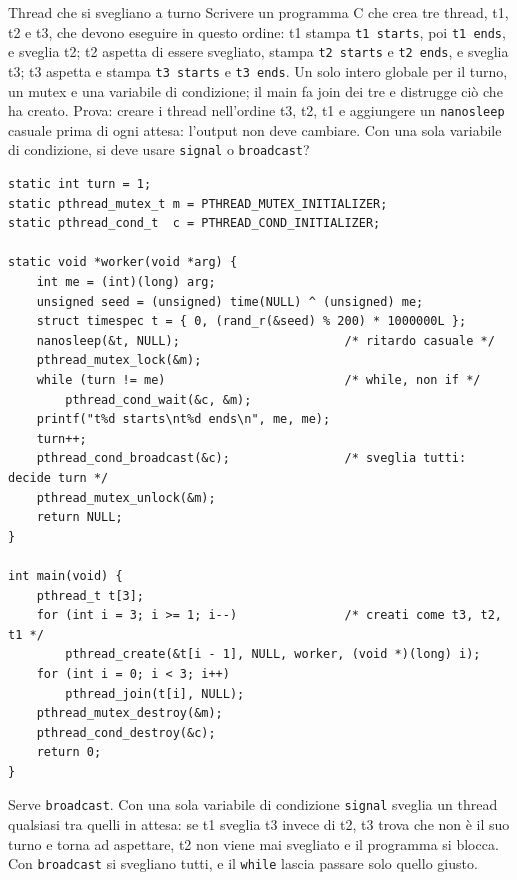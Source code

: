 \begin{esercizio}{Thread che si svegliano a turno}
Scrivere un programma C che crea tre thread, t1, t2 e t3, che devono eseguire in questo ordine: t1 stampa \texttt{t1 starts}, poi
\texttt{t1 ends}, e sveglia t2; t2 aspetta di essere svegliato, stampa \texttt{t2 starts} e \texttt{t2 ends}, e sveglia t3; t3 aspetta e
stampa \texttt{t3 starts} e \texttt{t3 ends}. Un solo intero globale per il turno, un mutex e una variabile di condizione; il main fa join
dei tre e distrugge ciò che ha creato. Prova: creare i thread nell'ordine t3, t2, t1 e aggiungere un \texttt{nanosleep} casuale prima di
ogni attesa: l'output non deve cambiare. Con una sola variabile di condizione, si deve usare \texttt{signal} o \texttt{broadcast}?

\svolgimento
\begin{lstlisting}[language={[POSIX]C}]
static int turn = 1;
static pthread_mutex_t m = PTHREAD_MUTEX_INITIALIZER;
static pthread_cond_t  c = PTHREAD_COND_INITIALIZER;

static void *worker(void *arg) {
    int me = (int)(long) arg;
    unsigned seed = (unsigned) time(NULL) ^ (unsigned) me;
    struct timespec t = { 0, (rand_r(&seed) % 200) * 1000000L };
    nanosleep(&t, NULL);                       /* ritardo casuale */
    pthread_mutex_lock(&m);
    while (turn != me)                         /* while, non if */
        pthread_cond_wait(&c, &m);
    printf("t%d starts\nt%d ends\n", me, me);
    turn++;
    pthread_cond_broadcast(&c);                /* sveglia tutti: decide turn */
    pthread_mutex_unlock(&m);
    return NULL;
}

int main(void) {
    pthread_t t[3];
    for (int i = 3; i >= 1; i--)               /* creati come t3, t2, t1 */
        pthread_create(&t[i - 1], NULL, worker, (void *)(long) i);
    for (int i = 0; i < 3; i++)
        pthread_join(t[i], NULL);
    pthread_mutex_destroy(&m);
    pthread_cond_destroy(&c);
    return 0;
}
\end{lstlisting}
Serve \texttt{broadcast}. Con una sola variabile di condizione \texttt{signal} sveglia un thread qualsiasi tra quelli in attesa: se t1
sveglia t3 invece di t2, t3 trova che non è il suo turno e torna ad aspettare, t2 non viene mai svegliato e il programma si blocca. Con
\texttt{broadcast} si svegliano tutti, e il \texttt{while} lascia passare solo quello giusto.
\end{esercizio}

